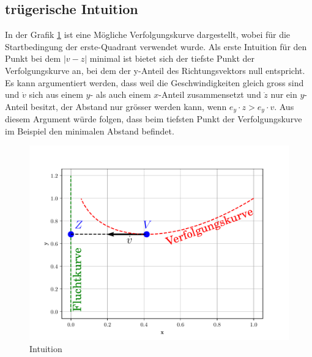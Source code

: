 \subsection{trügerische Intuition}%
In der Grafik \ref{lambertw:grafic:intuition} ist eine Mögliche Verfolgungskurve dargestellt, wobei für die Startbedingung der erste-Quadrant verwendet wurde.
Als erste Intuition für den Punkt bei dem $|v-z|$ minimal ist bietet sich der tiefste Punkt der Verfolgungskurve an, bei dem der y-Anteil des Richtungsvektors null entspricht.
Es kann argumentiert werden, dass weil die Geschwindigkeiten gleich gross sind und $\dot{v}$ sich aus einem $y$- als auch einem $x$-Anteil zusammensetzt und $\dot{z}$ nur ein $y$-Anteil besitzt, der Abstand nur grösser werden kann, wenn $e_y\cdot z>e_y\cdot v$.
Aus diesem Argument würde folgen, dass beim tiefsten Punkt der Verfolgungskurve im Beispiel den minimalen Abstand befindet.
%
\begin{figure}
	\centering
	\includegraphics[scale=0.4]{./papers/lambertw/Bilder/Intuition.pdf}
	\caption{Intuition}
	\label{lambertw:grafic:intuition}
\end{figure}
%

